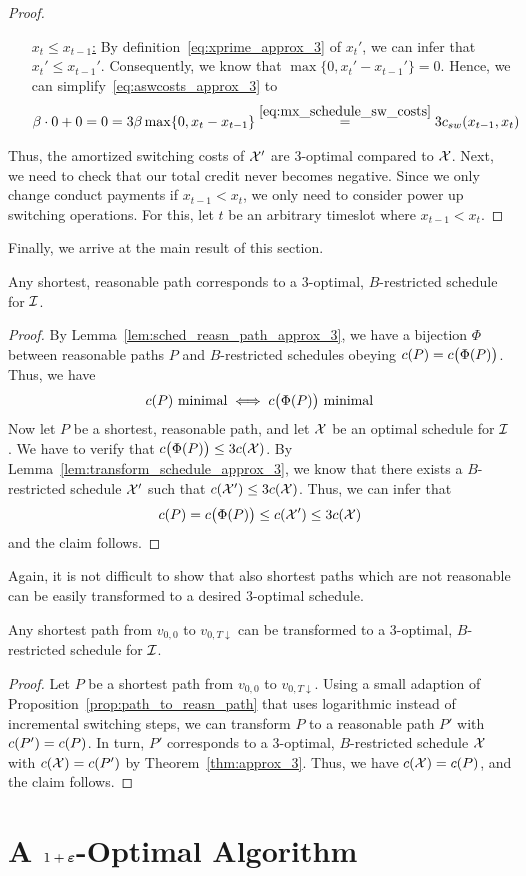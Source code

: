 \begin{proof}
\begin{enumerate}[align=left]
	\item[\underline{$x_t\le x_{t-1}$:}] By definition~\eqref{eq:xprime_approx_3} of $x_t'$, we can infer that $x_t'\le x_{t-1}'$. Consequently, we know that $\max\{0,x_t'-x_{t-1}'\}=0$. Hence, we can simplify~\eqref{eq:aswcosts_approx_3} to
		\begin{align*}
			\beta\cdot0+0=0=3\beta\max\{0,x_t-x_{t-1}\}\stackrel{\eqref{eq:mx_schedule_sw_costs}}{=}3c_{sw}(x_{t-1},x_t)
		\end{align*}
\end{enumerate}
Thus, the amortized switching costs of $\mathcal{X}'$ are 3-optimal compared to $\mathcal{X}$. Next, we need to check that our total credit never becomes negative. Since we only change conduct payments if $x_{t-1}<x_t$, we only need to consider power up switching operations. For this, let $t$ be an arbitrary timeslot where $x_{t-1}<x_t$.
\end{proof}
Finally, we arrive at the main result of this section.
\begin{thm}\label{thm:approx_3}
Any shortest, reasonable path corresponds to a 3-optimal, $B$-restricted schedule for $\mathcal{I}$.
\end{thm} 
\begin{proof}
By Lemma~\ref{lem:sched_reasn_path_approx_3}, we have a bijection $\Phi$ between reasonable paths $P$ and $B$-restricted schedules obeying $c(P)=c\bigl(\Phi(P)\bigr)$. Thus, we have 
\begin{equation*}
	c(P)\text{ minimal}\iff c\bigl(\Phi(P)\big)\text{ minimal}
\end{equation*}
Now let $P$ be a shortest, reasonable path, and let $\mathcal{X}$ be an optimal schedule for $\mathcal{I}$. We have to verify that $c\bigl(\Phi(P)\bigr)\le 3c(\mathcal{X})$. By Lemma~\ref{lem:transform_schedule_approx_3}, we know that there exists a $B$-restricted schedule $\mathcal{X}'$ such that $c(\mathcal{X}')\le 3c(\mathcal{X})$. Thus, we can infer that
\begin{equation*}
	c(P)=c\bigl(\Phi(P)\bigr)\le c(\mathcal{X}')\le 3c(\mathcal{X})
\end{equation*}
and the claim follows.
\end{proof}
Again, it is not difficult to show that also shortest paths which are not reasonable can be easily transformed to a desired 3-optimal schedule.
\begin{cor}\label{cor:opt_sched_short_path_pseudo_lin}
Any shortest path from $v_{0,0}$ to $v_{0,T\downarrow}$ can be transformed to a 3-optimal, $B$-restricted schedule for $\mathcal{I}$.
\end{cor}
\begin{proof}
Let $P$ be a shortest path from $v_{0,0}$ to $v_{0,T\downarrow}$. Using a small adaption of Proposition~\ref{prop:path_to_reasn_path} that uses logarithmic instead of incremental switching steps, we can transform $P$ to a reasonable path $P'$ with $c(P')=c(P)$.
In turn, $P'$ corresponds to a 3-optimal, $B$-restricted schedule $\mathcal{X}$ with $c(\mathcal{X})=c(P')$ by Theorem~\ref{thm:approx_3}. Thus, we have $c(\mathcal{X})=c(P)$, and the claim follows.
\end{proof}


\section{A $1+\boldsymbol\varepsilon$-Optimal Algorithm}
